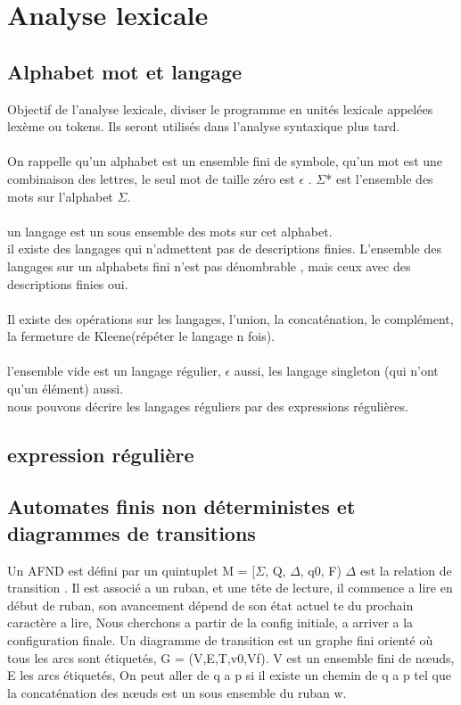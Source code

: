 \documentclass{article}
\begin{document}
\section{Analyse lexicale}
\subsection{Alphabet mot et langage} Objectif de l'analyse lexicale, diviser le programme en unités lexicale appelées lexème ou tokens. Ils seront utilisés dans l'analyse syntaxique plus tard.\\\\ On rappelle qu'un alphabet est un ensemble fini de symbole, qu'un mot est une combinaison des lettres, le seul mot de taille zéro est $\epsilon$ . $\Sigma$* est l'ensemble des mots sur l'alphabet $\Sigma$.\\\\ un langage est un sous ensemble des mots sur cet alphabet.\\ il existe des langages qui n'admettent pas de descriptions finies. L'ensemble des langages sur un alphabets fini n'est pas dénombrable , mais ceux avec des descriptions finies oui.\\\\ Il existe des opérations sur les langages, l'union, la concaténation, le complément, la fermeture de Kleene(répéter le langage n fois).\\\\ l'ensemble vide est un langage régulier, {$\epsilon$} aussi, les langage singleton (qui n'ont qu'un élément) aussi. \\ nous pouvons décrire les langages réguliers par des expressions régulières. 
\subsection{expression régulière}
\subsection{Automates finis non déterministes et diagrammes de transitions} Un AFND est défini par un quintuplet M = [$\Sigma$, Q, $\Delta$, q0, F) $\Delta$ est la relation de transition . Il est associé a un ruban, et une tête de lecture, il commence a lire en début de ruban, son avancement dépend de son état actuel te du prochain caractère a lire, Nous cherchons a partir de la config initiale, a arriver a la configuration finale. Un diagramme de transition est un graphe fini orienté où tous les arcs sont étiquetés, G = (V,E,T,v0,Vf). V est un ensemble fini de nœuds, E les arcs étiquetés, On peut aller de q a p si il existe un chemin de q a p tel que la concaténation des nœuds est un sous ensemble du ruban w.
\newpage
\end{document}
